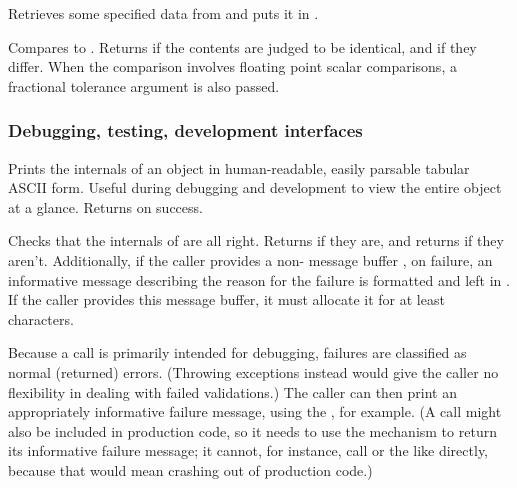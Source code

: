 \begin{sreapi}
\hypertarget{ifc:Fetch}
{\item[\ccode{\_Fetch*(obj, ..., \&ret\_value)}]}

Retrieves some specified data from  and puts it in
.

\hypertarget{ifc:Compare}
{\item[\ccode{\_Compare*(obj1, obj2...)}]}

Compares  to . Returns  if the
contents are judged to be identical, and  if they
differ. When the comparison involves floating point scalar
comparisons, a fractional tolerance argument  is also
passed. 

\end{sreapi}



\subsubsection{Debugging, testing, development interfaces}

\begin{sreapi}
\hypertarget{ifc:Dump}
{\item[\ccode{\_Dump*(FILE *fp, obj...)}]}

Prints the internals of an object in human-readable, easily parsable
tabular ASCII form. Useful during debugging and development to view
the entire object at a glance. Returns  on success.

\hypertarget{ifc:Validate}
{\item[\ccode{\_Validate*(obj, errbuf...)}]}

Checks that the internals of  are all right. Returns
 if they are, and returns  if they
aren't. Additionally, if the caller provides a non-
message buffer , on failure, an informative message
describing the reason for the failure is formatted and left in
. If the caller provides this message buffer, it must
allocate it for at least  characters.

Because a  call is primarily intended for
debugging, failures are classified as normal (returned) errors.
(Throwing exceptions instead would give the caller no flexibility in
dealing with failed validations.) The caller can then print an
appropriately informative failure message, using the ,
for example. (A  call might also be included in
production code, so it needs to use the  mechanism to
return its informative failure message; it cannot, for instance, call
 or the like directly, because that would mean
crashing out of production code.)

\end{sreapi}



